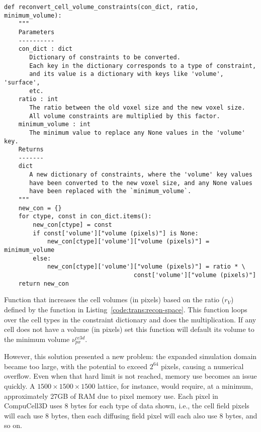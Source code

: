 \begin{listing}[H]%
\begin{verbatim}
def reconvert_cell_volume_constraints(con_dict, ratio, minimum_volume):
    """
    Parameters
    ----------
    con_dict : dict
       Dictionary of constraints to be converted.
       Each key in the dictionary corresponds to a type of constraint,
       and its value is a dictionary with keys like 'volume', 'surface', 
       etc.
    ratio : int
       The ratio between the old voxel size and the new voxel size.
       All volume constraints are multiplied by this factor.
    minimum_volume : int
       The minimum value to replace any None values in the 'volume' key.
    Returns
    -------
    dict
       A new dictionary of constraints, where the 'volume' key values
       have been converted to the new voxel size, and any None values
       have been replaced with the `minimum_volume`.
    """
    new_con = {}
    for ctype, const in con_dict.items():
        new_con[ctype] = const
        if const['volume']["volume (pixels)"] is None:
            new_con[ctype]['volume']["volume (pixels)"] = minimum_volume
        else:
            new_con[ctype]['volume']["volume (pixels)"] = ratio * \
                                    const['volume']["volume (pixels)"]
    return new_con
\end{verbatim}
\caption{Function that increases the cell volumes (in pixels) based on the ratio ($r_V$) defined by the function in Listing~\ref{code:trans:recon-space}. This function loops over the cell types in the constraint dictionary and does the multiplication. If any cell does not have a volume (in pixels) set this function will default its volume to the minimum volume $\nu^{cc3d}_{px}$.}\label{code:trans:recon-space:vol}
\end{listing}

However, this solution presented a new problem: the expanded simulation domain became too large, with the potential to exceed $2^{64}$ pixels, causing a numerical overflow. Even when that hard limit is not reached, memory use becomes an issue quickly. A $1500 \times 1500 \times 1500$ lattice, for instance, would require, at a minimum, approximately 27GB of RAM due to pixel memory use. Each pixel in CompuCell3D uses 8 bytes for each type of data shown, i.e., the cell field pixels will each use 8 bytes, then each diffusing field pixel will each also use 8 bytes, and so on.

